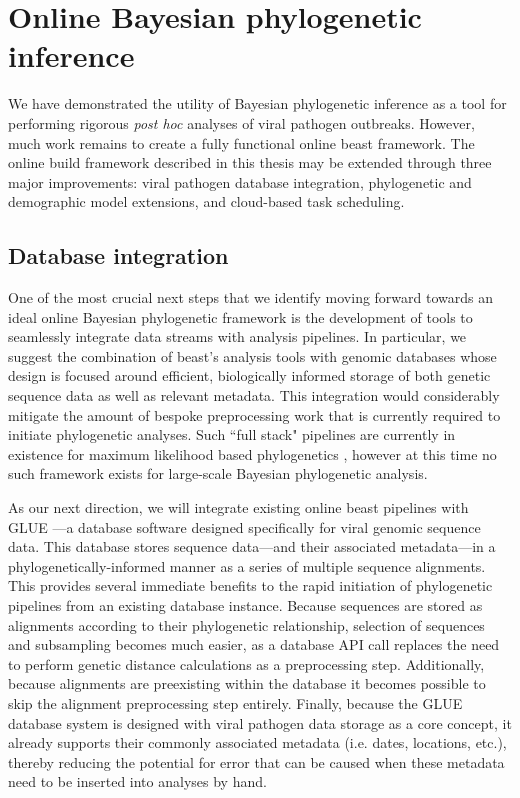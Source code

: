 \section{Online Bayesian phylogenetic inference}

We have demonstrated the utility of Bayesian phylogenetic inference as a tool for performing rigorous \textit{post hoc} analyses of viral pathogen outbreaks.
However, much work remains to create a fully functional online \gls{beast} framework.
The online build framework described in this thesis may be extended through three major improvements: viral pathogen database integration, phylogenetic and demographic model extensions, and cloud-based task scheduling.

\subsection{Database integration}

One of the most crucial next steps that we identify moving forward towards an ideal online Bayesian phylogenetic framework is the development of tools to seamlessly integrate data streams with analysis pipelines.
In particular, we suggest the combination of \gls{beast}'s analysis tools with genomic databases whose design is focused around efficient, biologically informed storage of both genetic sequence data as well as relevant metadata.
This integration would considerably mitigate the amount of bespoke preprocessing work that is currently required to initiate phylogenetic analyses.
Such ``full stack" pipelines are currently in existence for maximum likelihood based phylogenetics \cite{hadfield2019nextstrain}, however at this time no such framework exists for large-scale Bayesian phylogenetic analysis.

As our next direction, we will integrate existing online \gls{beast} pipelines with GLUE \cite{singer2018glue}---a database software designed specifically for viral genomic sequence data.
This database stores sequence data---and their associated metadata---in a phylogenetically-informed manner as a series of multiple sequence alignments.
This provides several immediate benefits to the rapid initiation of phylogenetic pipelines from an existing database instance.
Because sequences are stored as alignments according to their phylogenetic relationship, selection of sequences and subsampling becomes much easier, as a database API call replaces the need to perform genetic distance calculations as a preprocessing step.
Additionally, because alignments are preexisting within the database it becomes possible to skip the alignment preprocessing step entirely.
Finally, because the GLUE database system is designed with viral pathogen data storage as a core concept, it already supports their commonly associated metadata (i.e. dates, locations, etc.), thereby reducing the potential for error that can be caused when these metadata need to be inserted into analyses by hand.

